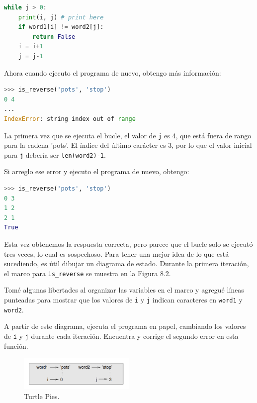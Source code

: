 \begin{lstlisting}[language=Python]
while j > 0:
    print(i, j) # print here
    if word1[i] != word2[j]:
        return False
    i = i+1
    j = j-1
\end{lstlisting}

Ahora cuando ejecuto el programa de nuevo, obtengo más información:

\begin{lstlisting}[language=Python]
>>> is_reverse('pots', 'stop')
0 4
...
IndexError: string index out of range
\end{lstlisting}

La primera vez que se ejecuta el bucle, el valor de \texttt{j} es 4, que está fuera de rango para la cadena 'pots'. El índice del último carácter es 3, por lo que el valor inicial para \texttt{j} debería ser \texttt{len(word2)-1}.

Si arreglo ese error y ejecuto el programa de nuevo, obtengo:

\begin{lstlisting}[language=Python]
>>> is_reverse('pots', 'stop')
0 3
1 2
2 1
True
\end{lstlisting}

Esta vez obtenemos la respuesta correcta, pero parece que el bucle solo se ejecutó tres veces, lo cual es sospechoso. Para tener una mejor idea de lo que está sucediendo, es útil dibujar un diagrama de estado. Durante la primera iteración, el marco para \texttt{is\_reverse} se muestra en la Figura 8.2.

Tomé algunas libertades al organizar las variables en el marco y agregué líneas punteadas para mostrar que los valores de \texttt{i} y \texttt{j} indican caracteres en \texttt{word1} y \texttt{word2}.

A partir de este diagrama, ejecuta el programa en papel, cambiando los valores de \texttt{i} y \texttt{j} durante cada iteración. Encuentra y corrige el segundo error en esta función.

\begin{figure}[h]
        \centering
        \includegraphics[width=0.5\textwidth]{./images/chapter_8_2.png}
        \caption{Turtle Pies.}
        \label{fig:8_2}
        \end{figure}

